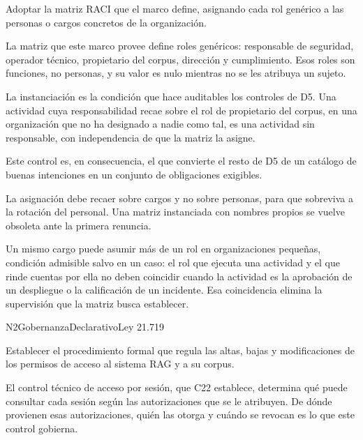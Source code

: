 Adoptar la matriz RACI que el marco define, asignando cada rol genérico a las personas o cargos concretos de la organización.

La matriz que este marco provee define roles genéricos: responsable de seguridad, operador técnico, propietario del corpus, dirección y cumplimiento. Esos roles son funciones, no personas, y su valor es nulo mientras no se les atribuya un sujeto.

La instanciación es la condición que hace auditables los controles de D5. Una actividad cuya responsabilidad recae sobre el rol de propietario del corpus, en una organización que no ha designado a nadie como tal, es una actividad sin responsable, con independencia de que la matriz la asigne.

Este control es, en consecuencia, el que convierte el resto de D5 de un catálogo de buenas intenciones en un conjunto de obligaciones exigibles.

La asignación debe recaer sobre cargos y no sobre personas, para que sobreviva a la rotación del personal. Una matriz instanciada con nombres propios se vuelve obsoleta ante la primera renuncia.

Un mismo cargo puede asumir más de un rol en organizaciones pequeñas, condición admisible salvo en un caso: el rol que ejecuta una actividad y el que rinde cuentas por ella no deben coincidir cuando la actividad es la aprobación de un despliegue o la calificación de un incidente. Esa coincidencia elimina la supervisión que la matriz busca establecer.


  {N2}{Gobernanza}{Declarativo}{Ley 21.719}

Establecer el procedimiento formal que regula las altas, bajas y modificaciones de los permisos de acceso al sistema RAG y a su corpus.

El control técnico de acceso por sesión, que C22 establece, determina qué puede consultar cada sesión según las autorizaciones que se le atribuyen. De dónde provienen esas autorizaciones, quién las otorga y cuándo se revocan es lo que este control gobierna.

